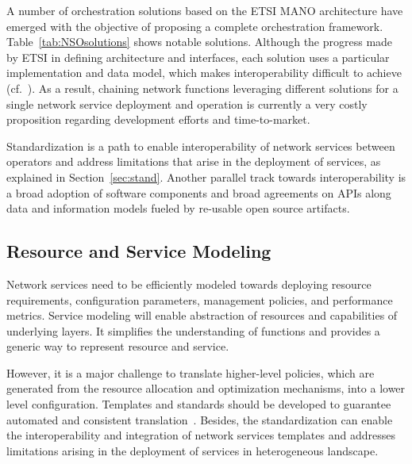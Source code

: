 A number of orchestration solutions based on the ETSI MANO architecture have emerged with the objective of proposing a complete orchestration framework. Table~\ref{tab:NSOsolutions} shows notable solutions. Although the progress made by ETSI in defining architecture and interfaces, each solution uses a particular implementation and data model, which makes interoperability difficult to achieve (cf.~\cite{NOn}). As a result, chaining network functions leveraging different solutions for a single network service deployment and operation is currently a very costly proposition regarding development efforts and time-to-market.   

Standardization is a path to enable interoperability of network services between operators and address limitations that arise in the deployment of services, as explained in Section~\ref{sec:stand}. Another parallel track towards interoperability is a broad adoption of software components and broad agreements on APIs along data and information models fueled by re-usable open source artifacts. 

\subsection{Resource and Service Modeling}

Network services need to be efficiently modeled towards deploying resource requirements, configuration parameters, management policies, and performance metrics. Service modeling will enable abstraction of resources and capabilities of underlying layers. It simplifies the understanding of functions and provides a generic way to represent resource and service. 

However, it is a major challenge to translate higher-level policies, which are generated from the resource allocation and optimization mechanisms, into a lower level configuration. Templates and standards should be developed to guarantee automated and consistent translation~\cite{YongLi2015Software-DefinedSurvey}. Besides, the standardization can enable the interoperability and integration of network services templates and addresses limitations arising in the deployment of services in heterogeneous landscape.


